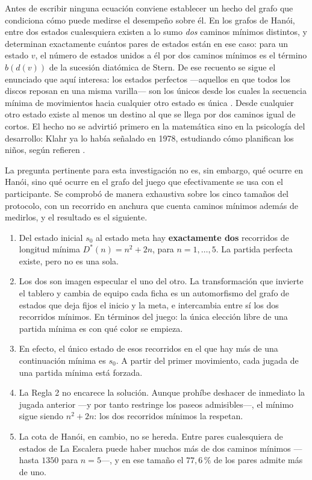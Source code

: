 \documentclass{book}
\begin{document}
Antes de escribir ninguna ecuación conviene establecer un hecho del
grafo que condiciona cómo puede medirse el desempeño sobre él. En los
grafos de Hanói, entre dos estados cualesquiera existen a lo sumo
\textit{dos} caminos mínimos distintos, y \citet{HinzKlavzar2005}
determinan exactamente cuántos pares de estados están en ese caso: para
un estado $v$, el número de estados unidos a él por dos caminos mínimos
es el término $b(d(v))$ de la sucesión diatómica de Stern. De ese
recuento se sigue el enunciado que aquí interesa: los estados perfectos
—aquellos en que todos los discos reposan en una misma varilla— son los
únicos desde los cuales la secuencia mínima de movimientos hacia
cualquier otro estado es única \citep[Corolario~3.7]{HinzKlavzar2005}.
Desde cualquier otro estado existe al menos un destino al que se llega
por dos caminos igual de cortos. El hecho no se advirtió primero en la
matemática sino en la psicología del desarrollo: Klahr ya lo había
señalado en 1978, estudiando cómo planifican los niños, según refieren
\citet{HinzKlavzar2005}.

La pregunta pertinente para esta investigación no es, sin embargo, qué
ocurre en Hanói, sino qué ocurre en el grafo del juego que efectivamente
se usa con el participante. Se comprobó de manera exhaustiva sobre los
cinco tamaños del protocolo, con un recorrido en anchura que cuenta
caminos mínimos además de medirlos, y el resultado es el siguiente.

\begin{enumerate}
    \item Del estado inicial $s_0$ al estado meta hay
    \textbf{exactamente dos} recorridos de longitud mínima
    $D^{*}(n) = n^{2}+2n$, para $n = 1, \ldots, 5$. La partida perfecta
    existe, pero no es una sola.

    \item Los dos son imagen especular el uno del otro. La
    transformación que invierte el tablero y cambia de equipo cada ficha
    es un automorfismo del grafo de estados que deja fijos el inicio y
    la meta, e intercambia entre sí los dos recorridos mínimos. En
    términos del juego: la única elección libre de una partida mínima es
    con qué color se empieza.

    \item En efecto, el único estado de esos recorridos en el que hay
    más de una continuación mínima es $s_0$. A partir del primer
    movimiento, cada jugada de una partida mínima está forzada.

    \item La Regla 2 no encarece la solución. Aunque prohíbe deshacer de
    inmediato la jugada anterior —y por tanto restringe los paseos
    admisibles—, el mínimo sigue siendo $n^{2}+2n$: los dos recorridos
    mínimos la respetan.

    \item La cota de Hanói, en cambio, no se hereda. Entre pares
    cualesquiera de estados de La Escalera puede haber muchos más de dos
    caminos mínimos —hasta $1350$ para $n=5$—, y en ese tamaño el
    $77{,}6\,\%$ de los pares admite más de uno.
\end{enumerate}
\end{document}
